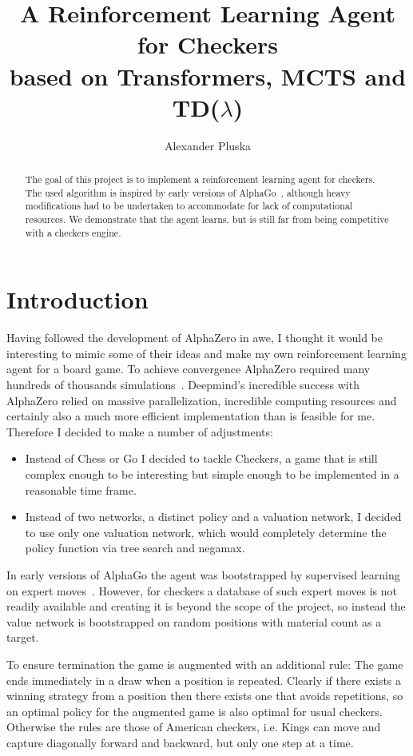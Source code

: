 \documentclass[a4paper,12pt]{article}
\title{A Reinforcement Learning Agent for Checkers\\based on Transformers, MCTS and TD($\lambda$)}
\author{Alexander Pluska}
\theoremstyle{definition}
\theoremstyle{definition}
\theoremstyle{definition}
\theoremstyle{definition}
\theoremstyle{definition}
\theoremstyle{definition}
\begin{document}
	
	\maketitle
	
	\begin{abstract}
		The goal of this project is to implement a reinforcement learning agent for checkers. The used algorithm is inspired by early versions of AlphaGo~\cite{silver2016mastering}, although heavy modifications had to be undertaken to accommodate for lack of computational resources. We demonstrate that the agent learns, but is still far from being competitive with a checkers engine.
	\end{abstract}
	
	\section{Introduction}
	
	Having followed the development of AlphaZero in awe, I thought it would be interesting to mimic some of their ideas and make my own reinforcement learning agent for a board game. To achieve convergence AlphaZero required many hundreds of thousands simulations~\cite{silver2018general}.
	Deepmind's incredible success with AlphaZero relied on massive parallelization, incredible computing resources and certainly also a much more efficient implementation than is feasible for me. Therefore I decided to make a number of adjustments:
	\begin{itemize}
		\item Instead of Chess or Go I decided to tackle Checkers, a game that is still complex enough to be interesting but simple enough to be implemented in a reasonable time frame.
		\item Instead of two networks, a distinct policy and a valuation network, I decided to use only one valuation network, which would completely determine the policy function via tree search and negamax.
	\end{itemize}
	
	In early versions of AlphaGo the agent was bootstrapped by supervised learning on expert moves~\cite{silver2016mastering}. However, for checkers a database of such expert moves is not readily available and creating it is beyond the scope of the project, so instead the value network is bootstrapped on random positions with material count as a target.
	
	To ensure termination the game is augmented with an additional rule: The game ends immediately in a draw when a position is repeated. Clearly if there exists a winning strategy from a position then there exists one that avoids repetitions, so an optimal policy for the augmented game is also optimal for usual checkers. Otherwise the rules are those of American checkers, i.e. Kings can move and capture diagonally forward and backward, but only one step at a time.
\end{document}
